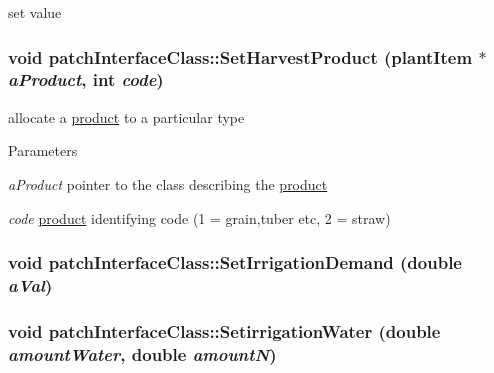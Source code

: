 set value \hypertarget{classpatch_interface_class_a6c21218372f6dcc9a1e447af1f3afe22}{
\subsubsection[{SetHarvestProduct}]{\setlength{\rightskip}{0pt plus 5cm}void patchInterfaceClass::SetHarvestProduct ({\bf plantItem} $\ast$ {\em aProduct}, \/  int {\em code})}}
\label{classpatch_interface_class_a6c21218372f6dcc9a1e447af1f3afe22}


allocate a \hyperlink{classproduct}{product} to a particular type 
\begin{DoxyParams}{Parameters}
\item[{\em aProduct}]pointer to the class describing the \hyperlink{classproduct}{product} \item[{\em code}]\hyperlink{classproduct}{product} identifying code (1 = grain,tuber etc, 2 = straw) \end{DoxyParams}
\hypertarget{classpatch_interface_class_aaf208063e24dc0db976319ed6c69ff61}{
\subsubsection[{SetIrrigationDemand}]{\setlength{\rightskip}{0pt plus 5cm}void patchInterfaceClass::SetIrrigationDemand (double {\em aVal})}}
\label{classpatch_interface_class_aaf208063e24dc0db976319ed6c69ff61}
\hypertarget{classpatch_interface_class_a5f6d5f6deb20dd2acc8b39f581312541}{
\subsubsection[{SetirrigationWater}]{\setlength{\rightskip}{0pt plus 5cm}void patchInterfaceClass::SetirrigationWater (double {\em amountWater}, \/  double {\em amountN})}}
\label{classpatch_interface_class_a5f6d5f6deb20dd2acc8b39f581312541}


